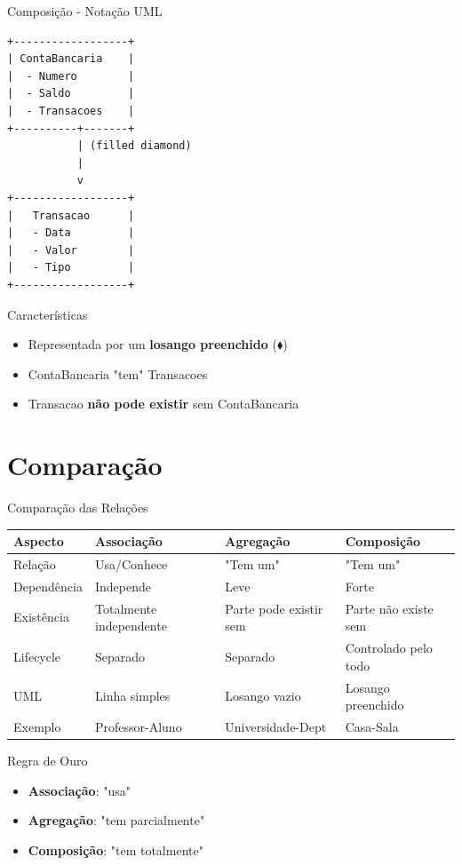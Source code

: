 \documentclass[aspectratio=169]{beamer}
\begin{document}
\begin{frame}[fragile]{Composição - Notação UML}
\begin{center}
\begin{verbatim}
+------------------+
| ContaBancaria    |
|  - Numero        |
|  - Saldo         |
|  - Transacoes    |
+----------+-------+
           | (filled diamond)
           |
           v
+------------------+
|   Transacao      |
|   - Data         |
|   - Valor        |
|   - Tipo         |
+------------------+
\end{verbatim}
\end{center}

\vspace{0.5cm}
\begin{block}{Características}
\begin{itemize}
\item Representada por um \textbf{losango preenchido} ($\blacklozenge$)
\item ContaBancaria "tem" Transacoes
\item Transacao \textbf{não pode existir} sem ContaBancaria
\end{itemize}
\end{block}
\end{frame}

\section{Comparação}

\begin{frame}{Comparação das Relações}
\begin{table}
\centering
\small
\begin{tabular}{|l|p{3cm}|p{3cm}|p{3cm}|}
\hline
\textbf{Aspecto} & \textbf{Associação} & \textbf{Agregação} & \textbf{Composição} \\
\hline
Relação & Usa/Conhece & "Tem um" & "Tem um" \\
\hline
Dependência & Independe & Leve & Forte \\
\hline
Existência & Totalmente independente & Parte pode existir sem & Parte não existe sem \\
\hline
Lifecycle & Separado & Separado & Controlado pelo todo \\
\hline
UML & Linha simples & Losango vazio & Losango preenchido \\
\hline
Exemplo & Professor-Aluno & Universidade-Dept & Casa-Sala \\
\hline
\end{tabular}
\end{table}

\vspace{0.3cm}
\begin{alertblock}{Regra de Ouro}
\begin{itemize}
\item \textbf{Associação}: "usa"
\item \textbf{Agregação}: "tem parcialmente"
\item \textbf{Composição}: "tem totalmente"
\end{itemize}
\end{alertblock}
\end{frame}
\end{document}

